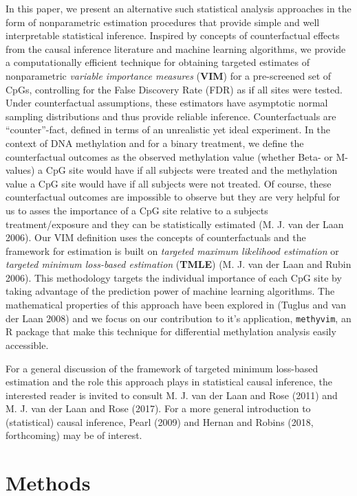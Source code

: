 \documentclass[9pt,a4paper,]{extarticle}
\theoremstyle{definition}
\theoremstyle{definition}
\theoremstyle{definition}
\theoremstyle{remark}
\begin{document}
In this paper, we present an alternative such statistical analysis
approaches in the form of nonparametric estimation procedures that
provide simple and well interpretable statistical inference. Inspired by
concepts of counterfactual effects from the causal inference literature
and machine learning algorithms, we provide a computationally efficient
technique for obtaining targeted estimates of nonparametric
\emph{variable importance measures} (\textbf{VIM}) for a pre-screened
set of CpGs, controlling for the False Discovery Rate (FDR) as if all
sites were tested. Under counterfactual assumptions, these estimators
have asymptotic normal sampling distributions and thus provide reliable
inference. Counterfactuals are ``counter''-fact, defined in terms of an
unrealistic yet ideal experiment. In the context of DNA methylation and
for a binary treatment, we define the counterfactual outcomes as the
observed methylation value (whether Beta- or M-values) a CpG site would
have if all subjects were treated and the methylation value a CpG site
would have if all subjects were not treated. Of course, these
counterfactual outcomes are impossible to observe but they are very
helpful for us to asses the importance of a CpG site relative to a
subjects treatment/exposure and they can be statistically estimated (M.
J. van der Laan 2006). Our VIM definition uses the concepts of
counterfactuals and the framework for estimation is built on
\emph{targeted maximum likelihood estimation} or \emph{targeted minimum
loss-based estimation} (\textbf{TMLE}) (M. J. van der Laan and Rubin
2006). This methodology targets the individual importance of each CpG
site by taking advantage of the prediction power of machine learning
algorithms. The mathematical properties of this approach have been
explored in (Tuglus and van der Laan 2008) and we focus on our
contribution to it's application, \texttt{methyvim}, an R package that
make this technique for differential methylation analysis easily
accessible.

For a general discussion of the framework of targeted minimum loss-based
estimation and the role this approach plays in statistical causal
inference, the interested reader is invited to consult M. J. van der
Laan and Rose (2011) and M. J. van der Laan and Rose (2017). For a more
general introduction to (statistical) causal inference, Pearl (2009) and
Hernan and Robins (2018, forthcoming) may be of interest.

\section{Methods}\label{methods}
\end{document}
